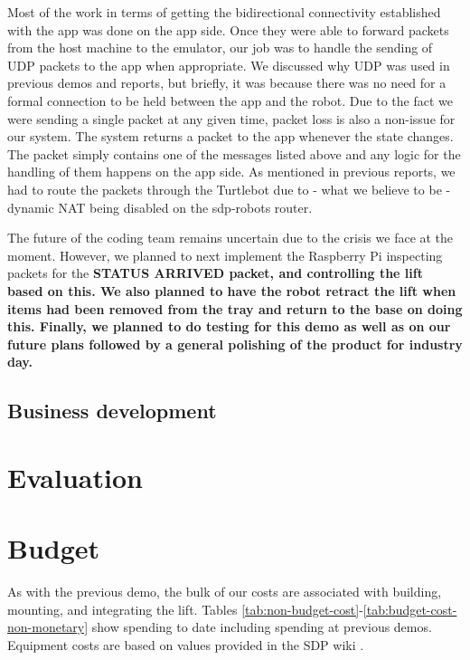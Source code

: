 \documentclass{article}
\begin{document}
Most of the work in terms of getting the bidirectional connectivity established with the app was done on the app side. Once they were able to forward packets from the host machine to the emulator, our job was to handle the sending of UDP packets to the app when appropriate. We discussed why UDP was used in previous demos and reports, but briefly, it was because there was no need for a formal connection to be held between the app and the robot. Due to the fact we were sending a single packet at any given time, packet loss is also a non-issue for our system. The system returns a packet to the app whenever the state changes. The packet simply contains one of the messages listed above and any logic for the handling of them happens on the app side. As mentioned in previous reports, we had to route the packets through the Turtlebot due to - what we believe to be - dynamic NAT being disabled on the sdp-robots router.

The future of the coding team remains uncertain due to the crisis we face at the moment. However, we planned to next implement the Raspberry Pi inspecting packets for the \bf{STATUS ARRIVED} packet, and controlling the lift based on this. We also planned to have the robot retract the lift when items had been removed from the tray and return to the base on doing this. Finally, we planned to do testing for this demo as well as on our future plans followed by a general polishing of the product for industry day.

\subsection{Business development}

\section{Evaluation}

\section{Budget}
As with the previous demo, the bulk of our costs are associated with building, mounting, and integrating the lift. Tables \ref{tab:non-budget-cost}-\ref{tab:budget-cost-non-monetary} show spending to date including spending at previous demos. Equipment costs are based on values provided in the SDP wiki \cite{sdpcosts}.
\end{document}
